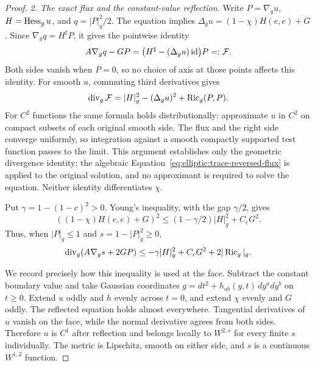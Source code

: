 \begin{proof}
\medskip\noindent
\emph{2. The exact flux and the constant-value reflection.}
Write $P=\nabla_g u$, $H=\operatorname{Hess}_g u$, and $q=|P|_g^2/2$.  The equation
implies
$\Delta_g u=(1-\chi)H(e,e)+G$.  Since
$\nabla_g q=H^\sharp P$, it gives the pointwise identity
\begin{equation}
 A\nabla_g q-GP
      =\bigl(H^\sharp-(\Delta_g u)\operatorname{id}\bigr)P=:\mathcal F.
 \label{eq:elliptic:trace-reversed-flux}
\end{equation}
Both sides vanish when $P=0$, so no choice of axis at those points affects
this identity.  For smooth $u$, commuting third derivatives gives
\begin{equation}
 \operatorname{div}_g\mathcal F
     =|H|_g^2-(\Delta_g u)^2+\operatorname{Ric}_g(P,P).
\label{eq:elliptic:trace-reversed-divergence}
\end{equation}
For $C^2$ functions the same formula holds distributionally: approximate
$u$ in $C^2$ on compact subsets of each original smooth side.  The flux
and the right side converge uniformly, so integration against a smooth
compactly supported test function passes to the limit.  This argument
establishes only the geometric divergence identity; the algebraic
Equation~\eqref{eq:elliptic:trace-reversed-flux} is applied to the original
solution, and no approximant is required to solve the equation.
Neither identity differentiates $\chi$.

Put $\gamma=1-(1-c)^2>0$.  Young's inequality, with the gap $\gamma/2$,
gives
\[
 ((1-\chi)H(e,e)+G)^2
     \leq(1-\gamma/2)|H|_g^2+C_cG^2.
\]
Thus, when $|P|_g\leq1$ and $s=1-|P|_g^2\geq0$,
\begin{equation}
 \operatorname{div}_g(A\nabla_g s+2GP)
       \leq-\gamma|H|_g^2+C_cG^2+2|\operatorname{Ric}_g|_g.
 \label{eq:elliptic:gradient-deficit}
\end{equation}

We record precisely how this inequality is used at the face.  Subtract
the constant boundary value and take Gaussian coordinates
$g=dt^2+h_{ab}(y,t)\,dy^a dy^b$ on $t\geq0$.  Extend $u$ oddly and
$h$ evenly across $t=0$, and extend $\chi$ evenly and $G$ oddly.
The reflected equation holds almost everywhere.  Tangential derivatives
of $u$ vanish on the face, while the normal derivative agrees from both
sides.  Therefore $u$ is $C^1$ after reflection and belongs locally to
$W^{2,s}$ for every finite $s$ individually.  The metric is Lipschitz,
smooth on either side, and $s$ is a continuous $W^{1,2}$ function.


\end{proof}
